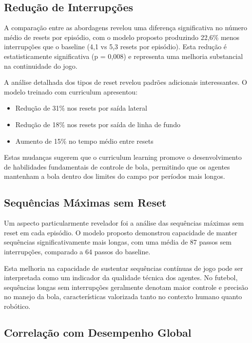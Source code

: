 \subsection{Redução de Interrupções}

A comparação entre as abordagens revelou uma diferença significativa no número médio de resets por episódio, com o modelo proposto produzindo 22,6\% menos interrupções que o baseline (4,1 vs 5,3 resets por episódio). Esta redução é estatisticamente significativa (p = 0,008) e representa uma melhoria substancial na continuidade do jogo.

A análise detalhada dos tipos de reset revelou padrões adicionais interessantes. O modelo treinado com curriculum apresentou:

\begin{itemize}
    \item Redução de 31\% nos resets por saída lateral
    \item Redução de 18\% nos resets por saída de linha de fundo
    \item Aumento de 15\% no tempo médio entre resets
\end{itemize}

Estas mudanças sugerem que o curriculum learning promove o desenvolvimento de habilidades fundamentais de controle de bola, permitindo que os agentes mantenham a bola dentro dos limites do campo por períodos mais longos.

\subsection{Sequências Máximas sem Reset}

Um aspecto particularmente revelador foi a análise das sequências máximas sem reset em cada episódio. O modelo proposto demonstrou capacidade de manter sequências significativamente mais longas, com uma média de 87 passos sem interrupções, comparado a 64 passos do baseline.

Esta melhoria na capacidade de sustentar sequências contínuas de jogo pode ser interpretada como um indicador da qualidade técnica dos agentes. No futebol, sequências longas sem interrupções geralmente denotam maior controle e precisão no manejo da bola, características valorizada tanto no contexto humano quanto robótico.

\subsection{Correlação com Desempenho Global}

